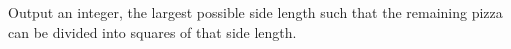 
  Output an integer, the largest possible side length such that the remaining pizza can be divided into squares of that side length.
